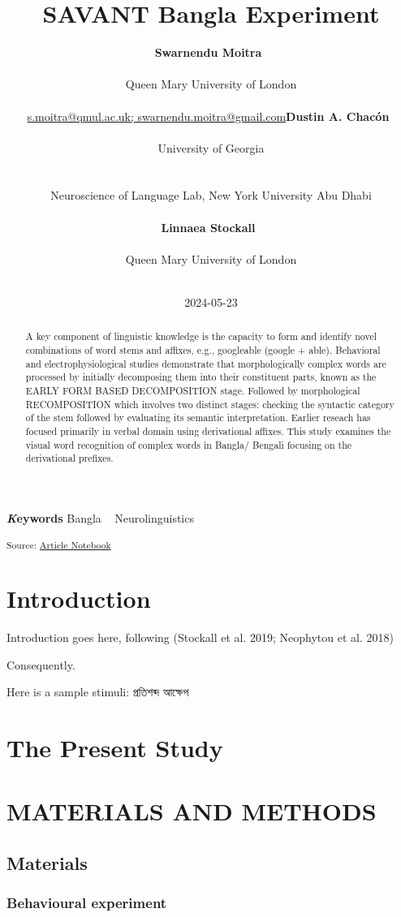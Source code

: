 \documentclass[
]{article}
\title{SAVANT Bangla Experiment}
\author{\textbf{Swarnendu
Moitra}~\orcidlink{0000-0001-6830-3284}\\\\Queen Mary University of
London\\\\\href{mailto:s.moitra@qmul.ac.uk;
swarnendu.moitra@gmail.com}{s.moitra@qmul.ac.uk;
swarnendu.moitra@gmail.com}\asep\textbf{Dustin A.
Chacón}~\orcidlink{0009-0002-8438-1914}\\\\University of
Georgia\\\\\\Neuroscience of Language Lab, New York University Abu
Dhabi\\\\\asep\textbf{Linnaea
Stockall}~\orcidlink{0000-0002-4700-5154}\\\\Queen Mary University of
London\\\\}
\date{2024-05-23}
\begin{document}
\maketitle
\begin{abstract}
A key component of linguistic knowledge is the capacity to form and
identify novel combinations of word stems and affixes, e.g., googleable
(google + able). Behavioral and electrophysiological studies demonstrate
that morphologically complex words are processed by initially
decomposing them into their constituent parts, known as the EARLY FORM
BASED DECOMPOSITION stage. Followed by morphological RECOMPOSITION which
involves two distinct stages: checking the syntactic category of the
stem followed by evaluating its semantic interpretation. Earlier reseach
has focused primarily in verbal domain using derivational affixes. This
study examines the visual word recognition of complex words in Bangla/
Bengali focusing on the derivational prefixes.
\end{abstract}
{\bfseries \emph Keywords}
\def\sep{\textbullet\ }
Bangla \sep 
Neurolinguistics


\textsubscript{Source:
\href{https://SwarMoi.github.io/Moitra-et-al_SAVANT/index.qmd.html}{Article
Notebook}}

\section{Introduction}\label{introduction}

Introduction goes here, following (Stockall et al. 2019; Neophytou et
al. 2018)

Consequently.

Here is a sample stimuli: প্রতিশব্দ আক্ষেপ

\section{The Present Study}\label{the-present-study}

\section{MATERIALS AND METHODS}\label{sec-data-methods}

\subsection{Materials}\label{materials}

\subsubsection{Behavioural experiment}\label{behavioural-experiment}
\end{document}
